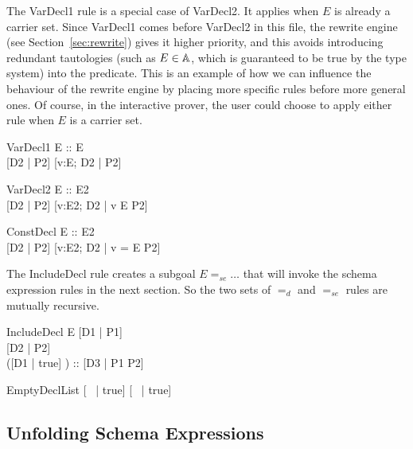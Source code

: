 \documentclass{entcs}
\newcommand{\sexprUnfoldsTo}{\mathrel{=_{se}}}
\newcommand{\declListUnfoldsTo}{\mathrel{=_d}}
\begin{document}
The VarDecl1 rule is a special case of VarDecl2.  It applies when $E$ is
already a carrier set.  Since VarDecl1 comes before VarDecl2 in this file,
the rewrite engine (see Section~\ref{sec:rewrite}) gives it higher
priority, and this avoids introducing redundant tautologies (such as $E \in
{\mathbb A}$, which is guaranteed to be true by the type system) into the
predicate.  This is an example of how we can influence the behaviour of the
rewrite engine by placing more specific rules before more general ones.  Of
course, in the interactive prover, the user could choose to apply either
rule when $E$ is a carrier set.

\begin{zedrule}{VarDecl1}
   E :: \power E \\
   [D1 | true] \declListUnfoldsTo [D2 | P2]
\derives
   [v:E; D1 | true] \declListUnfoldsTo [v:E; D2 |  P2]
\end{zedrule}

\begin{zedrule}{VarDecl2}
   E :: \power E2 \\
   [D1 | true] \declListUnfoldsTo [D2 | P2]
\derives
   [v:E; D1 | true] \declListUnfoldsTo [v:E2; D2 |  v \in E \land P2]
\end{zedrule}

\begin{zedrule}{ConstDecl}
   E :: E2 \\
   [D1 | true] \declListUnfoldsTo [D2 | P2]
\derives
   [v==E; D1 | true] \declListUnfoldsTo [v:E2; D2 |  v = E \land P2]
\end{zedrule}

The IncludeDecl rule creates a subgoal $E \sexprUnfoldsTo \ldots$ that
will invoke the schema expression rules in the next section.  So the
two sets of $\declListUnfoldsTo$ and $\sexprUnfoldsTo$ rules are
mutually recursive.

\begin{zedrule}{IncludeDecl}
   E \sexprUnfoldsTo [D1 | P1] \\
   [D | true] \declListUnfoldsTo [D2 | P2] \\
   ([D1 | true] \land [D2 | true]) :: \power [D3 | true] 
\derives
   [E; D | true] \declListUnfoldsTo [D3 |  P1 \land P2]
\end{zedrule}

\begin{zedrule}{EmptyDeclList}
   [~ | true] \declListUnfoldsTo [~ | true]
\end{zedrule}


\subsection{Unfolding Schema Expressions}
\end{document}
